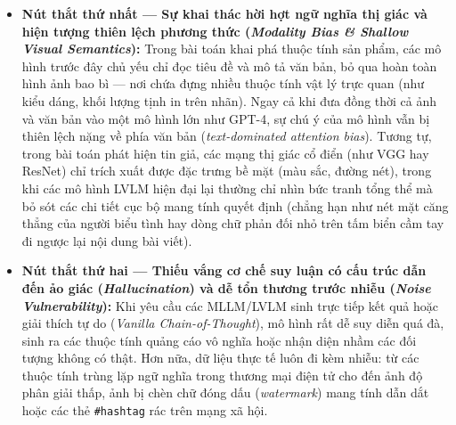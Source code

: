 \documentclass[conference,10pt]{IEEEtran}
\begin{document}
\begin{itemize}
    \item \textbf{Nút thắt thứ nhất --- Sự khai thác hời hợt ngữ nghĩa thị giác và hiện tượng thiên lệch phương thức (\textit{Modality Bias \& Shallow Visual Semantics}):}
    Trong bài toán khai phá thuộc tính sản phẩm, các mô hình trước đây chủ yếu chỉ đọc tiêu đề và mô tả văn bản, bỏ qua hoàn toàn hình ảnh bao bì --- nơi chứa đựng nhiều thuộc tính vật lý trực quan (như kiểu dáng, khối lượng tịnh in trên nhãn). Ngay cả khi đưa đồng thời cả ảnh và văn bản vào một mô hình lớn như GPT-4, sự chú ý của mô hình vẫn bị thiên lệch nặng về phía văn bản (\textit{text-dominated attention bias}). Tương tự, trong bài toán phát hiện tin giả, các mạng thị giác cổ điển (như VGG hay ResNet) chỉ trích xuất được đặc trưng bề mặt (màu sắc, đường nét), trong khi các mô hình LVLM hiện đại lại thường chỉ nhìn bức tranh tổng thể mà bỏ sót các chi tiết cục bộ mang tính quyết định (chẳng hạn như nét mặt căng thẳng của người biểu tình hay dòng chữ phản đối nhỏ trên tấm biển cầm tay đi ngược lại nội dung bài viết).

    \item \textbf{Nút thắt thứ hai --- Thiếu vắng cơ chế suy luận có cấu trúc dẫn đến ảo giác (\textit{Hallucination}) và dễ tổn thương trước nhiễu (\textit{Noise Vulnerability}):}
    Khi yêu cầu các MLLM/LVLM sinh trực tiếp kết quả hoặc giải thích tự do (\textit{Vanilla Chain-of-Thought}), mô hình rất dễ suy diễn quá đà, sinh ra các thuộc tính quảng cáo vô nghĩa hoặc nhận diện nhầm các đối tượng không có thật. Hơn nữa, dữ liệu thực tế luôn đi kèm nhiễu: từ các thuộc tính trùng lặp ngữ nghĩa trong thương mại điện tử cho đến ảnh độ phân giải thấp, ảnh bị chèn chữ đóng dấu (\textit{watermark}) mang tính dẫn dắt hoặc các thẻ \texttt{\#hashtag} rác trên mạng xã hội.
\end{itemize}
\end{document}
